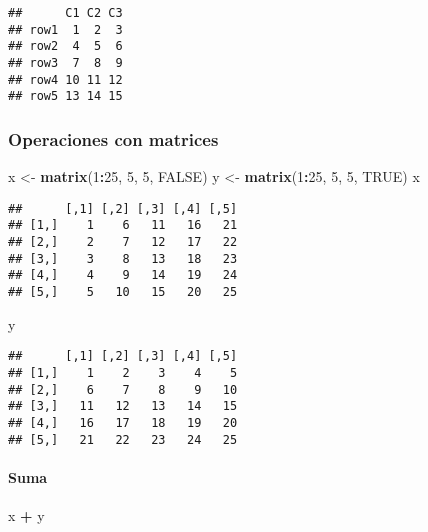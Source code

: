 \documentclass[11pt,]{article}
\newenvironment{Shaded}{\begin{snugshade}}{\end{snugshade}}
\newcommand{\DecValTok}[1]{\textcolor[rgb]{0.00,0.00,0.81}{#1}}
\newcommand{\KeywordTok}[1]{\textcolor[rgb]{0.13,0.29,0.53}{\textbf{#1}}}
\newcommand{\NormalTok}[1]{#1}
\newcommand{\OperatorTok}[1]{\textcolor[rgb]{0.81,0.36,0.00}{\textbf{#1}}}
\newcommand{\OtherTok}[1]{\textcolor[rgb]{0.56,0.35,0.01}{#1}}
\newcommand{\StringTok}[1]{\textcolor[rgb]{0.31,0.60,0.02}{#1}}
\begin{document}
\begin{verbatim}
##      C1 C2 C3
## row1  1  2  3
## row2  4  5  6
## row3  7  8  9
## row4 10 11 12
## row5 13 14 15
\end{verbatim}

\hypertarget{operaciones-con-matrices}{%
\subsubsection{Operaciones con
matrices}\label{operaciones-con-matrices}}

\begin{Shaded}
\begin{Highlighting}[]
\NormalTok{x <-}\StringTok{ }\KeywordTok{matrix}\NormalTok{(}\DecValTok{1}\OperatorTok{:}\DecValTok{25}\NormalTok{, }\DecValTok{5}\NormalTok{, }\DecValTok{5}\NormalTok{, }\OtherTok{FALSE}\NormalTok{)}
\NormalTok{y <-}\StringTok{ }\KeywordTok{matrix}\NormalTok{(}\DecValTok{1}\OperatorTok{:}\DecValTok{25}\NormalTok{, }\DecValTok{5}\NormalTok{, }\DecValTok{5}\NormalTok{, }\OtherTok{TRUE}\NormalTok{)}
\NormalTok{x}
\end{Highlighting}
\end{Shaded}

\begin{verbatim}
##      [,1] [,2] [,3] [,4] [,5]
## [1,]    1    6   11   16   21
## [2,]    2    7   12   17   22
## [3,]    3    8   13   18   23
## [4,]    4    9   14   19   24
## [5,]    5   10   15   20   25
\end{verbatim}

\begin{Shaded}
\begin{Highlighting}[]
\NormalTok{y}
\end{Highlighting}
\end{Shaded}

\begin{verbatim}
##      [,1] [,2] [,3] [,4] [,5]
## [1,]    1    2    3    4    5
## [2,]    6    7    8    9   10
## [3,]   11   12   13   14   15
## [4,]   16   17   18   19   20
## [5,]   21   22   23   24   25
\end{verbatim}

\hypertarget{suma}{%
\paragraph{Suma}\label{suma}}

\begin{Shaded}
\begin{Highlighting}[]
\NormalTok{x }\OperatorTok{+}\StringTok{ }\NormalTok{y}
\end{Highlighting}
\end{Shaded}
\end{document}
